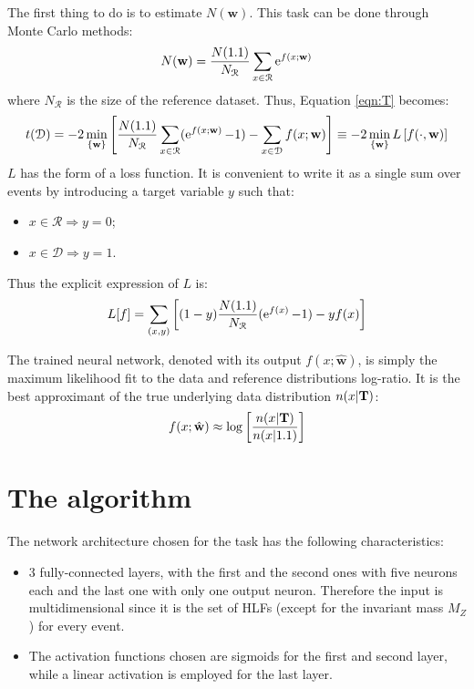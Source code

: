 The first thing to do is to estimate $N(\mathbf{w})$. This task can be done through Monte Carlo methods:
\begin{equation}
	N(\mathbf{w}) = \frac{N(1.1)}{N_{\mathcal{R}}} \sum_{x \in \mathcal{R}} \operatorname{e}^{f(x;\mathbf{w})}
\end{equation}
where $N_\mathcal{R}$ is the size of the reference dataset. Thus, Equation \ref{eqn:T} becomes:
\begin{equation}
	t(\mathcal{D}) = -2 \min_{\{\mathbf{w}\}}{\left[
	\frac{N(1.1)}{N_{\mathcal{R}}} \sum_{x \in \mathcal{R}} (\operatorname{e}^{f(x;\mathbf{w})} -1) -
	\sum_{x \in \mathcal{D}} f(x;\mathbf{w})
	\right]}
	\equiv
	-2 \min_{\{\mathbf{w}\}}{L \left[ f(\cdot,\mathbf{w}) \right]}
\end{equation}
$L$ has the form of a loss function. It is convenient to write it as a single sum over events by introducing a target variable $y$ such that:
\begin{itemize}
	\item $x \in \mathcal{R} \Longrightarrow y=0$;
	\item $x \in \mathcal{D} \Longrightarrow y=1$.
\end{itemize}
Thus the explicit expression of $L$ is:
\begin{equation}
	L[f] = \sum_{(x,y)} \left[
	(1-y) \frac{N(1.1)}{N_{\mathcal{R}}} (\operatorname{e}^{f(x)} - 1) - yf(x)
	\right]	\label{eqn:LOSS}
\end{equation}

The trained neural network, denoted with its output $f(x;\hat{\mathbf{w}})$, is simply the maximum likelihood fit to the data and reference distributions log-ratio. It is the best approximant of the true underlying data distribution $n(x|\text{\textbf{T}})$:
\begin{equation}
	f(x;\hat{\mathbf{w}}) \approx \log{ \left[
	\frac{n(x|\text{\textbf{T}})}{n(x|1.1)}
	\right] }
\end{equation}


\section{The algorithm}
The network architecture chosen for the task has the following characteristics:
\begin{itemize}
	\item 3 fully-connected layers, with the first and the second ones with five neurons each and the last one with only one output neuron. Therefore the input is multidimensional since it is the set of HLFs (except for the invariant mass $M_{Z}$) for every event.
	\item The activation functions chosen are sigmoids for the first and second layer, while a linear activation is employed for the last layer.
\end{itemize}

